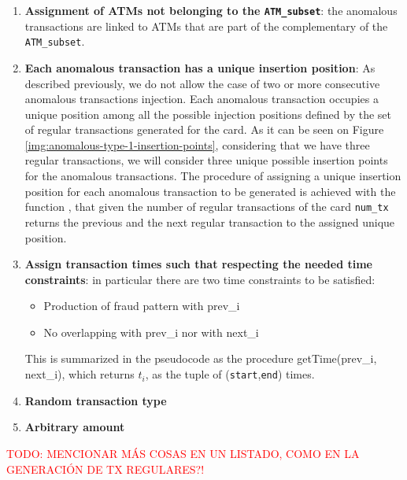 \documentclass{article}
\begin{document}
\begin{enumerate}
  \item \textbf{Assignment of ATMs not belonging to the \texttt{ATM\_subset}}: the anomalous transactions are linked to ATMs that are part of the complementary of the \texttt{ATM\_subset}.
  \item \textbf{Each anomalous transaction has a unique insertion position}: As described previously, we do not allow the case of two or more consecutive anomalous transactions injection. Each anomalous transaction occupies a unique position among all the possible injection positions defined by the set of regular transactions generated for the card. As it can be seen on Figure \ref{img:anomalous-type-1-insertion-points}, considering that we have three regular transactions, we will consider three unique possible insertion points for the anomalous transactions. The procedure of assigning a unique insertion position for each anomalous transaction to be generated is achieved with the function , that given the number of regular transactions of the card \texttt{num\_tx} returns the previous and the next regular transaction to the assigned unique position.
  \item \textbf{Assign transaction times such that respecting the needed time constraints}: in particular there are two time constraints to be satisfied:
  \begin{itemize}
    \item Production of fraud pattern with prev\_i
    \item No overlapping with prev\_i nor with next\_i
  \end{itemize}
  This is summarized in the pseudocode as the procedure getTime(prev\_i, next\_i), which returns $t_i$, as the tuple of (\texttt{start},\texttt{end}) times.
  \item \textbf{Random transaction type}
  \item \textbf{Arbitrary amount}
 
\end{enumerate}


\textcolor{red}{TODO: MENCIONAR MÁS COSAS EN UN LISTADO, COMO EN LA GENERACIÓN DE TX REGULARES?!}
\end{document}
